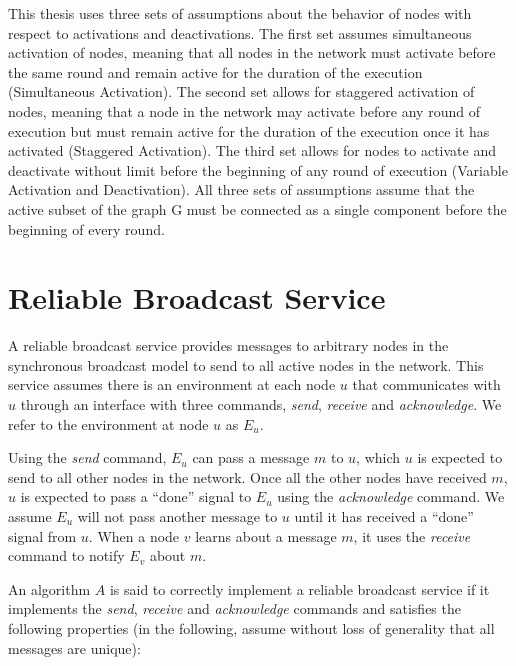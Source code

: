 \documentclass[english]{article}
\begin{document}
This thesis uses three sets of assumptions about the behavior of nodes with respect to activations and deactivations. The first set assumes simultaneous activation of nodes, meaning that all nodes in the network must activate before the same round and remain active for the duration of the execution (Simultaneous Activation). The second set allows for staggered activation of nodes, meaning that a node in the network may activate before any round of execution but must remain active for the duration of the execution once it has activated (Staggered Activation). The third set allows for nodes to activate and deactivate without limit before the beginning of any round of execution (Variable Activation and Deactivation). All three sets of assumptions assume that the active subset of the graph G must be connected as a single component before the beginning of every round.

\section{Reliable Broadcast Service}

A reliable broadcast service provides messages to arbitrary nodes in the synchronous broadcast model to send to all active nodes in the network. This service assumes there is an environment at each node $u$ that communicates with $u$ through an  interface with three commands, \textit{send}, \textit{receive} and \textit{acknowledge}. We refer to the environment at node $u$ as $E_u$.

Using the \textit{send} command, $E_u$ can pass a message $m$ to $u$, which $u$ is expected to send to all other nodes in the network. Once all the other nodes have received $m$, $u$ is expected to pass a ``done'' signal to $E_u$ using the \textit{acknowledge} command. We assume $E_u$ will not pass another message to $u$ until it has received a ``done'' signal from $u$. 
When a node $v$ learns about a message $m$, it uses the \textit{receive} command to notify $E_v$ about $m$.

An algorithm $A$ is said to correctly implement a reliable broadcast service if it implements the \textit{send}, \textit{receive} and \textit{acknowledge} commands and satisfies the following properties (in the following, assume without loss of generality that all messages are unique):
\end{document}

